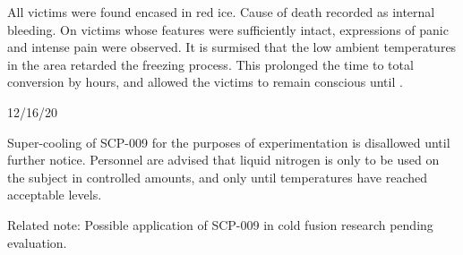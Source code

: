 All victims were found encased in red ice. Cause of death recorded as internal bleeding. On victims whose features were sufficiently intact, expressions of panic and intense pain were observed. It is surmised that the low ambient temperatures in the area retarded the freezing process. This prolonged the time to total conversion by  hours, and allowed the victims to remain conscious until \expunged.

 12/16/20

Super-cooling of SCP-009 for the purposes of experimentation is disallowed until further notice. Personnel are advised that liquid nitrogen is only to be used on the subject in controlled amounts, and only until temperatures have reached acceptable levels.

Related note: Possible application of SCP-009 in cold fusion research pending evaluation.